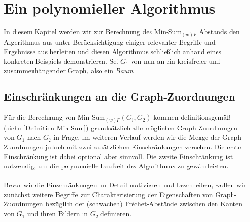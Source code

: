 \documentclass[a4paper, 12pt, twoside]{article}
\theoremstyle{Format1} %
\begin{document}
\newpage
\section{Ein polynomieller Algorithmus} \label{Kapitel 3}

In diesem Kapitel werden wir zur Berechnung des Min-Sum$_{(w)F}$ Abstands den Algorithmus aus \cite{Buchin} unter Berücksichtigung einiger relevanter
Begriffe und Ergebnisse aus \cite{Akitaya} herleiten und diesen Algorithmus schließlich anhand eines konkreten Beispiels demonstrieren.
Sei $G_1$ von nun an ein kreisfreier und zusammenhängender Graph, also ein \textit{Baum}.

\subsection{Einschränkungen an die Graph-Zuordnungen} \label{Einschränkungen}
Für die Berechnung von Min-Sum$_{(w)F}(G_1, G_2)$ kommen definitionsgemäß (siehe \ref{Definition Min-Sum}) grundsätzlich alle möglichen
Graph-Zuordnungen von $G_1$ nach $G_2$ in Frage.
Im weiteren Verlauf werden wir die Menge der Graph-Zuordnungen jedoch mit zwei zusätzlichen Einschränkungen versehen.
Die erste Einschränkung ist dabei optional aber sinnvoll. Die zweite Einschränkung ist notwendig, um die polynomielle Laufzeit des Algorithmus zu gewährleisten.
\\
\\
Bevor wir die Einschränkungen im Detail motivieren und beschreiben, wollen wir zunächst weitere Begriffe zur Charakterisierung der Eigenschaften von Graph-Zuordnungen bezüglich
der (schwachen) Fréchet-Abstände zwischen den Kanten von $G_1$ und ihren Bildern in $G_2$ definieren.
\end{document}
